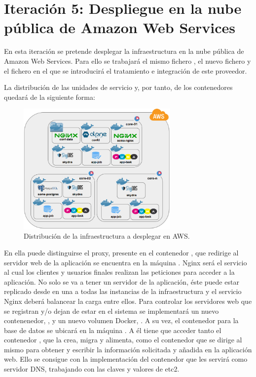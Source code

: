 \section[Iteración 5: Despliegue en Amazon Web Services]{Iteración 5: Despliegue en la nube pública de Amazon Web Services}

En esta iteración se pretende desplegar la infraestructura en la nube pública de Amazon Web Services. Para ello se trabajará el mismo fichero , el nuevo fichero  y el fichero  en el que se introducirá el tratamiento e integración de este proveedor.

La distribución de las unidades de servicio y, por tanto, de los contenedores quedará de la siguiente forma:

\begin{figure}[H]
\centering
\includegraphics[width=0.7\textwidth]{images/figures/aws-1-iteration.png}
\caption{Distribución de la infraestructura a desplegar en AWS.}
\end{figure}

En ella puede distinguirse el proxy, presente en el contenedor , que redirige al servidor web de la aplicación se encuentra en la máquina . Nginx será el servicio al cual los clientes y usuarios finales realizan las peticiones para acceder a la aplicación. No solo se va a tener un servidor de la aplicación, éste puede estar replicado desde en una a todas las instancias de la infraestructura y el servicio Nginx deberá balancear la carga entre ellos. Para controlar los servidores web que se registran y/o dejan de estar en el sistema se implementará un nuevo contenenedor, , y un nuevo volumen Docker, . A su vez, el contenedor  para la base de datos se ubicará en la máquina . A él tiene que acceder tanto el contenedor , que la crea, migra y alimenta, como el contenedor  que se dirige al mismo para obtener y escribir la información solicitada y añadida en la aplicación web. Ello se consigue con la implementación del contenedor  que les servirá como servidor DNS, trabajando con las claves y valores de etc2.

